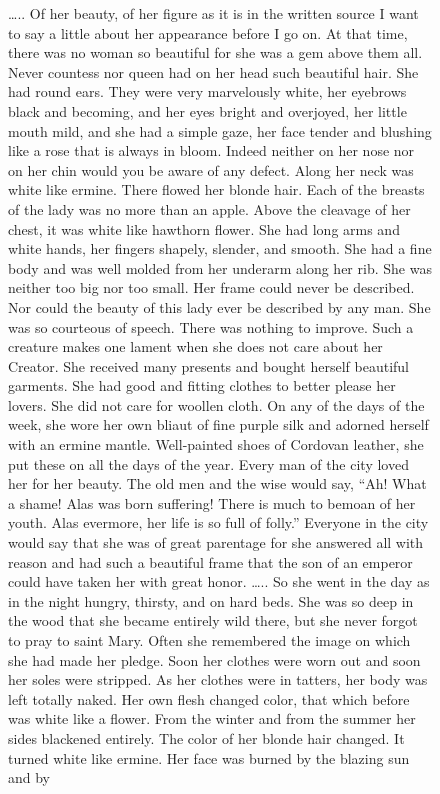 \documentclass[
  letterpaper,
  DIV=11,
  numbers=noendperiod,
  oneside]{scrreprt}
\begin{document}
\begin{figure}
\ldots.. Of her beauty, of her figure as it is in the written source I
want to say a little about her appearance before I go on. At that time,
there was no woman so beautiful for she was a gem above them all. Never
countess nor queen had on her head such beautiful hair. She had round
ears. They were very marvelously white, her eyebrows black and becoming,
and her eyes bright and overjoyed, her little mouth mild, and she had a
simple gaze, her face tender and blushing like a rose that is always in
bloom. Indeed neither on her nose nor on her chin would you be aware of
any defect. Along her neck was white like ermine. There flowed her
blonde hair. Each of the breasts of the lady was no more than an apple.
Above the cleavage of her chest, it was white like hawthorn flower. She
had long arms and white hands, her fingers shapely, slender, and smooth.
She had a fine body and was well molded from her underarm along her rib.
She was neither too big nor too small. Her frame could never be
described. Nor could the beauty of this lady ever be described by any
man. She was so courteous of speech. There was nothing to improve. Such
a creature makes one lament when she does not care about her Creator.
She received many presents and bought herself beautiful garments. She
had good and fitting clothes to better please her lovers. She did not
care for woollen cloth. On any of the days of the week, she wore her own
bliaut of fine purple silk and adorned herself with an ermine mantle.
Well-painted shoes of Cordovan leather, she put these on all the days of
the year. Every man of the city loved her for her beauty. The old men
and the wise would say, ``Ah! What a shame! Alas was born suffering!
There is much to bemoan of her youth. Alas evermore, her life is so full
of folly.'' Everyone in the city would say that she was of great
parentage for she answered all with reason and had such a beautiful
frame that the son of an emperor could have taken her with great honor.
\ldots.. So she went in the day as in the night hungry, thirsty, and on
hard beds. She was so deep in the wood that she became entirely wild
there, but she never forgot to pray to saint Mary. Often she remembered
the image on which she had made her pledge. Soon her clothes were worn
out and soon her soles were stripped. As her clothes were in tatters,
her body was left totally naked. Her own flesh changed color, that which
before was white like a flower. From the winter and from the summer her
sides blackened entirely. The color of her blonde hair changed. It
turned white like ermine. Her face was burned by the blazing sun and by

\end{figure}
\end{document}
